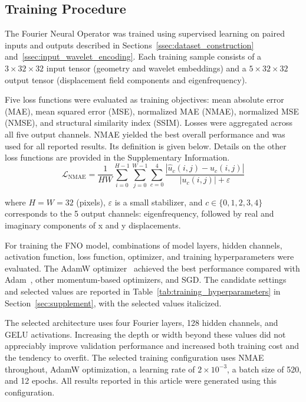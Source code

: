 \documentclass[preprint,review,12pt,numafflabel]{elsarticle}
\begin{document}


\subsection{Training Procedure}
\label{ssec:training_procedure}
The Fourier Neural Operator was trained using supervised learning on paired inputs and outputs described in Sections~\ref{ssec:dataset_construction} and~\ref{ssec:input_wavelet_encoding}. Each training sample consists of a $3 \times 32 \times 32$ input tensor (geometry and wavelet embeddings) and a $5 \times 32 \times 32$ output tensor (displacement field components and eigenfrequency).

Five loss functions were evaluated as training objectives: mean absolute error (MAE), mean squared error (MSE), normalized MAE (NMAE), normalized MSE (NMSE), and structural similarity index (SSIM). Losses were aggregated across all five output channels. NMAE yielded the best overall performance and was used for all reported results. Its definition is given below. Details on the other loss functions are provided in the Supplementary Information.
\begin{equation*}
    \mathcal{L}_{\text{NMAE}} = \frac{1}{HW} \sum_{i=0}^{H-1} \sum_{j=0}^{W-1} \sum_{c=0}^{4} \frac{\displaystyle \left| \hat{u}_{c}(i,j) - u_{c}(i,j) \right|}{\left| u_{c}(i,j) \right| + \varepsilon}
\end{equation*}

where $H = W = 32$ (pixels), $\varepsilon$ is a small stabilizer, and $c \in \{0,1,2,3,4\}$ corresponds to the 5 output channels: eigenfrequency, followed by real and imaginary components of x and y displacements.

For training the FNO model, combinations of model layers, hidden channels, activation function, loss function, optimizer, and training hyperparameters were evaluated. The AdamW optimizer~\cite{loshchilov2019adamw} achieved the best performance compared with Adam~\cite{kingma2015adam}, other momentum-based optimizers, and SGD. The candidate settings and selected values are reported in Table~\ref{tab:training_hyperparameters} in Section~\ref{sec:supplement}, with the selected values italicized.

The selected architecture uses four Fourier layers, 128 hidden channels, and GELU activations. Increasing the depth or width beyond these values did not appreciably improve validation performance and increased both training cost and the tendency to overfit. The selected training configuration uses NMAE throughout, AdamW optimization, a learning rate of $2\times10^{-3}$, a batch size of 520, and 12 epochs. All results reported in this article were generated using this configuration.
\end{document}
